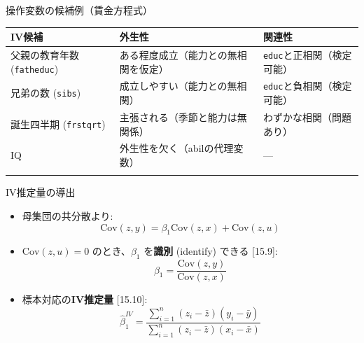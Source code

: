 \documentclass[
  ignorenonframetext,
]{beamer}
\providecommand{\tightlist}{%
  \setlength{\itemsep}{0pt}\setlength{\parskip}{0pt}}
\begin{document}
\begin{frame}[fragile]{操作変数の候補例（賃金方程式）}
\label{ux64cdux4f5cux5909ux6570ux306eux5019ux88dcux4f8bux8cc3ux91d1ux65b9ux7a0bux5f0f}
\begin{longtable}[]{@{}
  >{\raggedright\arraybackslash}p{}
  >{\raggedright\arraybackslash}p{}
  >{\raggedright\arraybackslash}p{}@{}}
\toprule\noalign{}
\begin{minipage}[b]{\linewidth}\raggedright
IV候補
\end{minipage} & \begin{minipage}[b]{\linewidth}\raggedright
外生性
\end{minipage} & \begin{minipage}[b]{\linewidth}\raggedright
関連性
\end{minipage} \\
\midrule\noalign{}
\endhead
父親の教育年数 (\texttt{fatheduc}) &
ある程度成立（能力との無相関を仮定） &
\texttt{educ}と正相関（検定可能） \\
兄弟の数 (\texttt{sibs}) & 成立しやすい（能力との無相関） &
\texttt{educ}と負相関（検定可能） \\
誕生四半期 (\texttt{frstqrt}) & 主張される（季節と能力は無関係） &
わずかな相関（問題あり） \\
IQ & 外生性を欠く（abilの代理変数） & --- \\
\bottomrule\noalign{}
\end{longtable}
\end{frame}

\begin{frame}{IV推定量の導出}
\label{ivux63a8ux5b9aux91cfux306eux5c0eux51fa}
\begin{itemize}
\tightlist
\item
  母集団の共分散より:
  \[\text{Cov}(z, y) = \beta_1 \text{Cov}(z, x) + \text{Cov}(z, u)\]
\item
  \(\text{Cov}(z, u) = 0\) のとき、\(\beta_1\) を\textbf{識別}
  (identify) できる {[}15.9{]}:
  \[\beta_1 = \frac{\text{Cov}(z, y)}{\text{Cov}(z, x)}\]
\item
  標本対応の\textbf{IV推定量} {[}15.10{]}:
  \[\hat{\beta}_1^{IV} = \frac{\sum_{i=1}^n (z_i - \bar{z})(y_i - \bar{y})}{\sum_{i=1}^n (z_i - \bar{z})(x_i - \bar{x})}\]
\end{itemize}
\end{frame}
\end{document}
